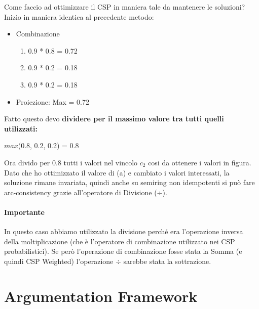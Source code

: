 Come faccio ad ottimizzare il CSP in maniera tale da mantenere le soluzioni?
\\Inizio in maniera identica al precedente metodo:
\begin{itemize}
    \item Combinazione
          \begin{enumerate}
              \item 0.9 * 0.8 = 0.72
              \item 0.9 * 0.2 = 0.18
              \item 0.9 * 0.2 = 0.18
          \end{enumerate}
    \item Proiezione: Max = 0.72
\end{itemize}
\noindent Fatto questo devo \textbf{dividere per il massimo valore tra tutti quelli utilizzati:}
\begin{center}
    $max$(0.8, 0.2, 0.2) = 0.8
\end{center}
Ora divido per 0.8 tutti i valori nel vincolo $c_2$ cosi da ottenere i valori in figura. Dato che ho ottimizzato il valore di (a) e cambiato i valori interessati, la soluzione rimane invariata, quindi anche su semiring non idempotenti si può fare arc-consistency grazie all'operatore di Divisione ($\div$).

\subsubsection{\textbf{Importante}}
In questo caso abbiamo utilizzato la divisione perché era l'operazione inversa della moltiplicazione (che è l'operatore di combinazione utilizzato nei CSP probabilistici). Se però l'operazione di combinazione fosse stata la Somma (e quindi CSP Weighted) l'operazione $\div$ sarebbe stata la sottrazione.


\chapter{Argumentation Framework} \label{ch:Argumentation Framework}
